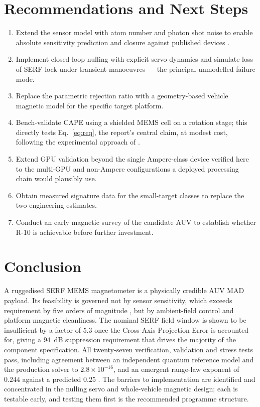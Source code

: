 \documentclass[11pt]{article}
\begin{document}
\section{Recommendations and Next Steps}
\begin{enumerate}[leftmargin=1.5em]
\item Extend the sensor model with atom number and photon shot noise
\cite{allred2002,mitchell2020} to enable absolute sensitivity prediction and
closure against published devices \cite{griffith2010}.
\item Implement closed-loop nulling with explicit servo dynamics
\cite{fang2012,borna2022b} and simulate loss of SERF lock under transient
manoeuvres --- the principal unmodelled failure mode.
\item Replace the parametric rejection ratio with a geometry-based vehicle
magnetic model \cite{tolles1950,gnadt2022} for the specific target platform.
\item Bench-validate CAPE using a shielded MEMS cell on a rotation stage; this
directly tests Eq.~\eqref{eq:req}, the report's central claim, at modest cost,
following the experimental approach of \cite{borna2022}.
\item Extend GPU validation beyond the single Ampere-class device verified here
to the multi-GPU and non-Ampere configurations a deployed processing chain would
plausibly use.
\item Obtain measured signature data for the small-target classes to replace the
two engineering estimates.
\item Conduct an early magnetic survey of the candidate AUV \cite{oehler2024} to
establish whether R-10 is achievable before further investment.
\end{enumerate}

\section{Conclusion}
A ruggedised SERF MEMS magnetometer is a physically credible AUV MAD payload. Its
feasibility is governed not by sensor sensitivity, which exceeds requirement by
five orders of magnitude \cite{griffith2010,oehler2024}, but by ambient-field
control and platform magnetic cleanliness. The nominal SERF field window
\cite{borna2022} is shown to be insufficient by a factor of $5.3$ once the
Cross-Axis Projection Error is accounted for, giving a $94$~dB suppression
requirement that drives the majority of the component specification. All
twenty-seven verification, validation and stress tests pass, including agreement
between an independent quantum reference model \cite{qutip2013} and the production
solver \cite{seltzer2008} to $2.8\times10^{-16}$, and an emergent range-law
exponent of $0.244$ against a predicted $0.25$ \cite{jackson1998}. The barriers to
implementation are identified and concentrated in the nulling servo and
whole-vehicle magnetic design; each is testable early, and testing them first is
the recommended programme structure.
\end{document}
